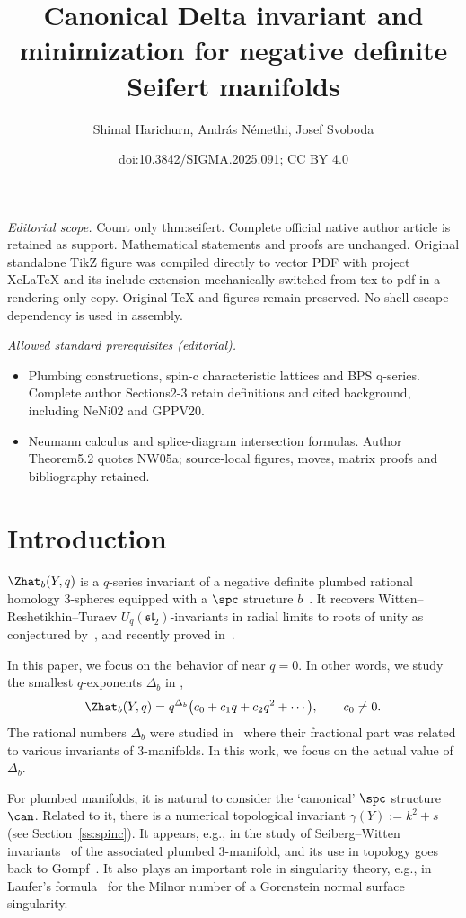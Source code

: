 \documentclass[10pt,a4paper]{amsart}
\title{Canonical Delta invariant and minimization for negative definite Seifert manifolds}
\author{Shimal Harichurn, András Némethi, Josef Svoboda}
\date{doi:10.3842/SIGMA.2025.091; CC BY 4.0}
\begin{document}
\maketitle
\noindent\textit{Editorial scope.} Count only thm:seifert. Complete official native author article is retained as support. Mathematical statements and proofs are unchanged. Original standalone TikZ figure was compiled directly to vector PDF with project XeLaTeX and its include extension mechanically switched from tex to pdf in a rendering-only copy. Original TeX and figures remain preserved. No shell-escape dependency is used in assembly.\par\medskip
\noindent\textit{Allowed standard prerequisites (editorial).}\begin{itemize}
\item Plumbing constructions, spin-c characteristic lattices and BPS q-series. Complete author Sections2-3 retain definitions and cited background, including NeNi02 and GPPV20.
\item Neumann calculus and splice-diagram intersection formulas. Author Theorem5.2 quotes NW05a; source-local figures, moves, matrix proofs and bibliography retained.
\end{itemize}\medskip
\section{Introduction}

$\Zhat_b(Y, q)$ is a $q$-series invariant of a negative definite plumbed rational homology 3-spheres equipped with a $\spc$ structure $b$~\cite{GPPV20}. It recovers Witten--Reshetikhin--Turaev $U_q(\mathfrak{sl}_2)$-invariants in radial limits to roots of unity as conjectured by~\cite{GPPV20}, and recently proved in~\cite{Mur23}.

In this paper, we focus on the behavior of  near $q=0$. In other words, we study the smallest $q$-exponents $\Delta_b$ in ,
\[
 \Zhat_b(Y,q) = q^{\Delta_b}\bigl(c_0+c_1 q + c_2 q^2 + \cdots\bigr), \qquad c_0 \neq 0.
\]
The rational numbers $\Delta_b$ were studied in~\cite{GPP21} where their fractional part was related to various invariants of 3-manifolds. In this work, we focus on the actual value of $\Delta_b$.

For plumbed manifolds, it is natural to consider the `canonical' $\spc$ structure $\can$. Related to it, there is a numerical topological invariant $\gamma(Y) := k^2+s$ (see Section~\ref{ss:spinc}).
It appears, e.g., in the study of Seiberg--Witten invariants~\cite{NeNi02} of the associated plumbed 3-manifold, and its use in topology goes back to Gompf~\cite{Gompf98}. It also plays an important role in singularity theory, e.g., in Laufer's formula~\cite{Laufer1977} for the Milnor number of a Gorenstein normal surface singularity.
\end{document}
